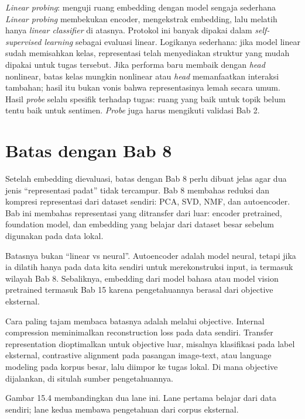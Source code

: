 \begin{pendalaman}{\emph{Linear probing}: menguji ruang embedding dengan model sengaja sederhana}
\emph{Linear probing} membekukan encoder, mengekstrak embedding, lalu melatih hanya \emph{linear classifier} di atasnya. Protokol ini banyak dipakai dalam \emph{self-supervised learning} sebagai evaluasi linear. Logikanya sederhana: jika model linear sudah memisahkan kelas, representasi telah menyediakan struktur yang mudah dipakai untuk tugas tersebut. Jika performa baru membaik dengan \emph{head} nonlinear, batas kelas mungkin nonlinear atau \emph{head} memanfaatkan interaksi tambahan; hasil itu bukan vonis bahwa representasinya lemah secara umum. Hasil \emph{probe} selalu spesifik terhadap tugas: ruang yang baik untuk topik belum tentu baik untuk sentimen. \emph{Probe} juga harus mengikuti validasi Bab 2.
\end{pendalaman}

\section{Batas dengan Bab 8}\label{batas-dengan-bab-8}

Setelah embedding dievaluasi, batas dengan Bab 8 perlu dibuat jelas agar dua jenis ``representasi padat'' tidak tercampur. Bab 8 membahas reduksi dan kompresi representasi dari dataset sendiri: PCA, SVD, NMF, dan autoencoder. Bab ini membahas representasi yang ditransfer dari luar: encoder pretrained, foundation model, dan embedding yang belajar dari dataset besar sebelum digunakan pada data lokal.

Batasnya bukan ``linear vs neural''. Autoencoder adalah model neural, tetapi jika ia dilatih hanya pada data kita sendiri untuk merekonstruksi input, ia termasuk wilayah Bab 8. Sebaliknya, embedding dari model bahasa atau model vision pretrained termasuk Bab 15 karena pengetahuannya berasal dari objective eksternal.

Cara paling tajam membaca batasnya adalah melalui objective. Internal compression meminimalkan reconstruction loss pada data sendiri. Transfer representation dioptimalkan untuk objective luar, misalnya klasifikasi pada label eksternal, contrastive alignment pada pasangan image-text, atau language modeling pada korpus besar, lalu diimpor ke tugas lokal. Di mana objective dijalankan, di situlah sumber pengetahuannya.

Gambar 15.4 membandingkan dua lane ini. Lane pertama belajar dari data sendiri; lane kedua membawa pengetahuan dari corpus eksternal.

